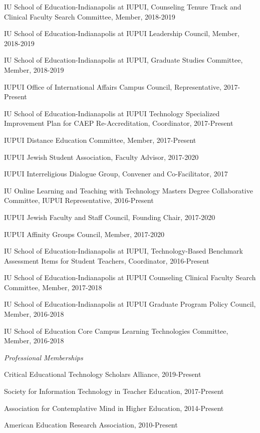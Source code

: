 \documentclass[11pt,article,oneside]{memoir}
\begin{document}
\ind IU School of Education-Indianapolis at IUPUI, Counseling Tenure Track and Clinical Faculty Search Committee, Member, 2018-2019

\ind IU School of Education-Indianapolis at IUPUI Leadership Council, Member, 2018-2019

\ind IU School of Education-Indianapolis at IUPUI, Graduate Studies Committee, Member, 2018-2019

\ind IUPUI Office of International Affairs Campus Council, Representative, 2017-Present

\ind IU School of Education-Indianapolis at IUPUI Technology Specialized Improvement Plan for CAEP Re-Accreditation, Coordinator, 2017-Present

\ind IUPUI Distance Education Committee, Member, 2017-Present

\ind IUPUI Jewish Student Association, Faculty Advisor, 2017-2020

\ind IUPUI Interreligious Dialogue Group, Convener and Co-Facilitator, 2017

\ind IU Online Learning and Teaching with Technology Masters Degree Collaborative Committee, IUPUI Representative, 2016-Present

\ind IUPUI Jewish Faculty and Staff Council, Founding Chair, 2017-2020

\ind IUPUI Affinity Groups Council, Member, 2017-2020

\ind IU School of Education-Indianapolis at IUPUI, Technology-Based Benchmark Assessment Items for Student Teachers, Coordinator, 2016-Present

\ind IU School of Education-Indianapolis at IUPUI Counseling Clinical Faculty Search Committee, Member, 2017-2018

\ind IU School of Education-Indianapolis at IUPUI Graduate Program Policy Council, Member, 2016-2018

\ind IU School of Education Core Campus Learning Technologies Committee, Member, 2016-2018

\medskip

\noindent\emph{Professional Memberships \vspace{0.01in}}

\ind Critical Educational Technology Scholars Alliance, 2019-Present

\ind Society for Information Technology in Teacher Education, 2017-Present

\ind Association for Contemplative Mind in Higher Education, 2014-Present

\ind American Education Research Association, 2010-Present
\end{document}
